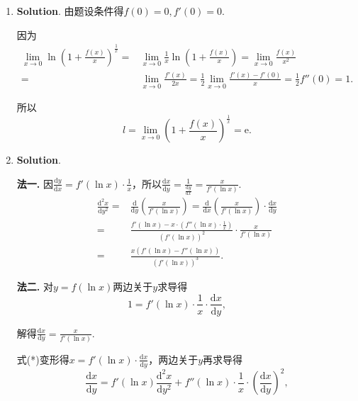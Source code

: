 \documentclass[../Main.tex]{subfiles}
\begin{document}
\begin{enumerate}
    \item \textbf{Solution}. 由题设条件得$f(0)=0,f'(0)=0$.

          因为
          \[
              \begin{aligned}
                  \lim_{x\to0}\ln\left(1+\frac{f(x)}{x}\right)^{\frac{1}{x}}= & \lim_{x\to0}\frac{1}{x}\ln\left(1+\frac{f(x)}{x}\right)=\lim_{x\to0}\frac{f(x)}{x^2}           \\
                  =                                                           & \lim_{x\to0}\frac{f'(x)}{2x}=\frac{1}{2}\lim_{x\to0}\frac{f'(x)-f'(0)}{x}=\frac{1}{2}f''(0)=1.
              \end{aligned}
          \]

          所以
          \[
              l=\lim_{x\to0}\left(1+\frac{f(x)}{x}\right)^{\frac{1}{x}}=\mathrm{e}.
          \]

    \item \textbf{Solution}.

          \textbf{法一.} 因$\frac{\mathrm{d}y}{\mathrm{d}x}=f'(\ln x)\cdot\frac{1}{x}$，所以$\frac{\mathrm{d}x}{\mathrm{d}y}
              =\frac{1}{\frac{\mathrm{d}y}{\mathrm{d}x}}=\frac{x}{f'(\ln x)}$.
          \[
              \begin{aligned}
                  \frac{\mathrm{d}^{2} x}{\mathrm{d}y^{2}}= & \frac{\mathrm{d}}{\mathrm{d}y}\left(\frac{x}{f'(\ln x)}\right)=\frac{\mathrm{d}}{\mathrm{d}x}\left(\frac{x}{f'(\ln x)}\right)\cdot\frac{\mathrm{d}x}{\mathrm{d}y} \\
                  =                                         & \frac{f'(\ln x)-x\cdot\left(f''(\ln x)\cdot\frac{1}{x}\right)}{(f'(\ln x))^{2}}\cdot\frac{x}{f'(\ln x)}                                                           \\
                  =                                         & \frac{x(f'(\ln x)-f''(\ln x))}{(f'(\ln x))^{3}}.
              \end{aligned}
          \]

          \textbf{法二.} 对$y=f(\ln x)$两边关于$y$求导得
          \[
              1=f'(\ln x)\cdot\frac{1}{x}\cdot\frac{\mathrm{d}x}{\mathrm{d}y},\qquad\tag
              {*}
          \]

          解得$\frac{\mathrm{d}x}{\mathrm{d}y}=\frac{x}{f'(\ln x)}.$

          式(*)变形得$x=f'(\ln x)\cdot\frac{\mathrm{d}x}{\mathrm{d}y}$，两边关于$y$再求导得
          \[
              \frac{\mathrm{d}x}{\mathrm{d}y}=f'(\ln x)\frac{\mathrm{d}^{2} x}{\mathrm{d}y^{2}}
              +f''(\ln x)\cdot\frac{1}{x}\cdot\left(\frac{\mathrm{d}x}{\mathrm{d}y}\right
              )^{2},
          \]


\end{enumerate}
\end{document}
